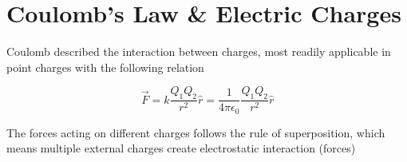 \chapter{Coulomb's Law \& Electric Charges}

Coulomb described the interaction between charges, most readily applicable in point charges with the following relation

\[\vec{F} = k \frac{Q_1 Q_2}{r^2} \hat{r} = \frac{1}{4\pi\epsilon_0} \frac{Q_1 Q_2}{r^2} \hat{r}\]

The forces acting on different charges follows the rule of superposition, which means multiple external charges create electrostatic interaction (forces) 
